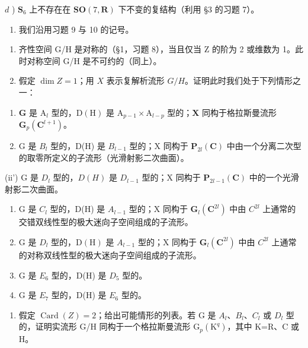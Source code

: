 \(d\) ) \(\mathbf{S}_6\) 上不存在在 \(\mathbf{SO}(7,\mathbf{R})\) 下不变的复结构（利用 §3 的习题 7）。

\begin{enumerate}
\def\labelenumi{\arabic{enumi})}
\setcounter{enumi}{10}
\tightlist
\item
  我们沿用习题 9 与 10 的记号。
\end{enumerate}

\begin{enumerate}
\def\labelenumi{\alph{enumi})}
\item
  齐性空间 G/H 是对称的（§1，习题 8），当且仅当 Z 的阶为 2 或维数为 1。此时对称空间 G/H 是不可约的（同上）。
\item
  假定 \(\dim Z = 1\)；用 \(X\) 表示复解析流形 \(G / H\)。证明此时我们处于下列情形之一：
\end{enumerate}

\begin{enumerate}
\def\labelenumi{(\roman{enumi})}
\item
  \(\mathbf{G}\) 是 \(\mathrm{A}_l\) 型的，\(\mathrm{D(H)}\) 是 \(\mathrm{A}_{p - 1}\times \mathrm{A}_{l - p}\) 型的；\(\mathbf{X}\) 同构于格拉斯曼流形 \(\mathbf{G}_p(\mathbf{C}^{l + 1})\)。
\item
  G 是 \(B_{l}\) 型的，D(H) 是 \(B_{l-1}\) 型的；X 同构于 \(\mathbf{P}_{2l}(\mathbf{C})\) 中由一个分离二次型的取零所定义的子流形（光滑射影二次曲面）。
\end{enumerate}

(ii') G 是 \(D_{l}\) 型的，\(D(H)\) 是 \(D_{l-1}\) 型的；X 同构于 \(\mathbf{P}_{2l-1}(\mathbf{C})\) 中的一个光滑射影二次曲面。

\begin{enumerate}
\def\labelenumi{(\roman{enumi})}
\setcounter{enumi}{2}
\item
  G 是 \(C_{l}\) 型的，D(H) 是 \(A_{l-1}\) 型的；X 同构于 \(\mathbf{G}_{l}(\mathbf{C}^{2l})\) 中由 \(C^{2l}\) 上通常的交错双线性型的极大迷向子空间组成的子流形。
\item
  G 是 \(D_{l}\) 型的，\(\mathrm{D}(\mathrm{H})\) 是 \(A_{l-1}\) 型的；X 同构于 \(\mathbf{G}_{l}(\mathbf{C}^{2l})\) 中由 \(C^{2l}\) 上通常的对称双线性型的极大迷向子空间组成的子流形。
\item
  G 是 \(E_{6}\) 型的，D(H) 是 \(D_{5}\) 型的。
\item
  G 是 \(E_{7}\) 型的，D(H) 是 \(E_{6}\) 型的。
\end{enumerate}

\begin{enumerate}
\def\labelenumi{\alph{enumi})}
\setcounter{enumi}{2}
\tightlist
\item
  假定 \(\operatorname{Card}(Z)=2\)；给出可能情形的列表。若 G 是 \(A_{l}\)、\(B_{l}\)、\(C_{l}\) 或 \(D_{l}\) 型的，证明实流形 G/H 同构于一个格拉斯曼流形 \(\mathrm{G}_{p}(\mathrm{K}^{q})\)，其中 K=R、C 或 H。
\end{enumerate}

